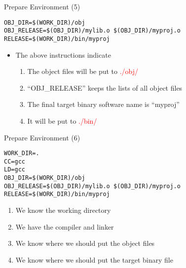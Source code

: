 \begin{frame}[fragile]{Prepare Environment (5)}
\vspace{-0.1in}
\lstset{language=[gnu] make}
\begin{lstlisting}[linewidth=0.9\linewidth, xleftmargin=0.05\linewidth, caption=Makefile]
OBJ_DIR=$(WORK_DIR)/obj
OBJ_RELEASE=$(OBJ_DIR)/mylib.o $(OBJ_DIR)/myproj.o
RELEASE=$(WORK_DIR)/bin/myproj
\end{lstlisting}
\vspace{-0.1in}
\begin{itemize}
	\item {The above instructions indicate}
	\begin{enumerate}
		\item {The object files will be put to \textcolor{red}{./obj/}}
		\item {``OBJ\_RELEASE'' keeps the lists of all object files}
		\item {The final target binary software name is ``myproj''}
		\item {It will be put to \textcolor{red}{./bin/}}
	\end{enumerate}
\end{itemize}

\end{frame}


\begin{frame}[fragile]{Prepare Environment (6)}
\lstset{language=[gnu] make}
\begin{lstlisting}[linewidth=0.9\linewidth, xleftmargin=0.05\linewidth]
WORK_DIR=.
CC=gcc
LD=gcc
OBJ_DIR=$(WORK_DIR)/obj
OBJ_RELEASE=$(OBJ_DIR)/mylib.o $(OBJ_DIR)/myproj.o
RELEASE=$(WORK_DIR)/bin/myproj
\end{lstlisting}

\begin{enumerate}
	\item {We know the working directory }
	\item {We have the compiler and linker}
	\item {We know where we should put the object files}
	\item {We know where we should put the target binary file}
\end{enumerate}
\end{frame}

